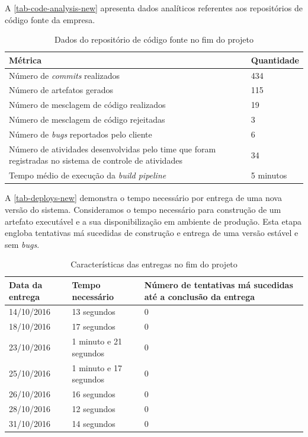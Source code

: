 \documentclass[
12pt,				%
openright,			%
oneside,			%
a4paper,			%
english,			%
french,				%
spanish,			%
brazil,				%
]{abntex2}
\begin{document}
A \autoref{tab-code-analysis-new} apresenta dados analíticos referentes aos repositórios de código fonte da empresa.

\begin{table}[htb]
	\caption{Dados do repositório de código fonte no fim do projeto}
	
	\label{tab-code-analysis-new}	
	\begin{tabular}{p{7.15cm}|p{7.10cm}}
		\textbf{Métrica} & \textbf{Quantidade}  \\
		\hline
		Número de \textit{commits} realizados & 434 \\
		\hline
		Número de artefatos gerados & 115 \\
		\hline
		Número de mesclagem de código realizados & 19 \\
		\hline
		Número de mesclagem de código rejeitadas & 3 \\
		\hline
		Número de \textit{bugs} reportados pelo cliente & 6 \\
		\hline
		Número de atividades desenvolvidas pelo time que foram registradas no sistema de controle de atividades & 34 \\
		\hline
		Tempo médio de execução da \textit{build pipeline} & 5 minutos \\
	\end{tabular}
\end{table}


A \autoref{tab-deploys-new} demonstra o tempo necessário por entrega de uma nova versão do sistema. Consideramos o tempo necessário para construção de um artefato executável e a sua disponibilização em ambiente de produção. Esta etapa engloba tentativas má sucedidas de construção e entrega de uma versão estável e sem \textit{bugs}.

\begin{table}[htb]
	\caption{Características das entregas no fim do projeto}
	
	\label{tab-deploys-new}	
	\begin{tabular}{p{3.85cm}|p{5.20cm}|p{5.20cm}}
		\textbf{Data da entrega} & \textbf{Tempo necessário} & \textbf{Número de tentativas má sucedidas até a conclusão da entrega}  \\
		\hline
		14/10/2016 & 13 segundos & 0 \\
		\hline
		18/10/2016 & 17 segundos & 0 \\
		\hline
		23/10/2016 & 1 minuto e 21 segundos & 0 \\
		\hline
		25/10/2016 & 1 minuto e 17 segundos & 0 \\
		\hline
		26/10/2016 & 16 segundos & 0 \\
		\hline
		28/10/2016 & 12 segundos & 0 \\
		\hline
		31/10/2016 & 14 segundos & 0 \\
	\end{tabular}
\end{table}
\end{document}
